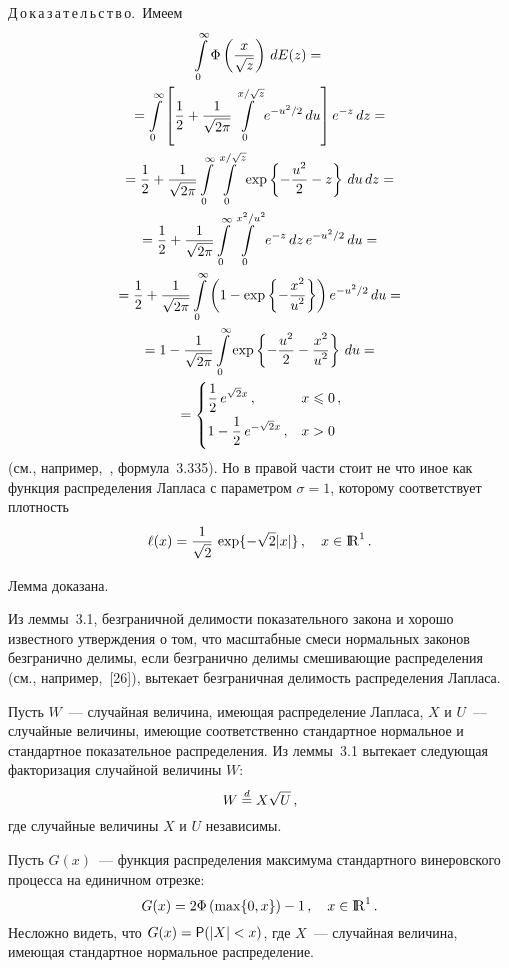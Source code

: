 \begin{multicols}{2}
\noindent
Д\,о\,к\,а\,з\,а\,т\,е\,л\,ь\,с\,т\,в\,о.~Имеем
\begin{multline*}
\int\limits_{0}^{\infty}\Phi\left(\fr{x}{\sqrt{z}}\right)\,dE(z)={}\\
{}=\int\limits_{0}^
{\infty}\left[ \fr{1}{2}+
\fr{1}{\sqrt{2\pi}}\int\limits_{0}^{x/\sqrt{z}}e^{-u^2/2}\,du\right ]
e^{-z}\,dz={}\\
{}=\fr{1}{2}+\fr{1}{\sqrt{2\pi}}\int\limits_{0}^{\infty}
\int\limits_{0}^{x/\sqrt{z}}\exp\left\{
-\fr{u^2}{2}-z\right \}\,du\,dz={}\\
{}=
\fr{1}{2}+\fr{1}{\sqrt{2\pi}}
\int\limits_{0}^{\infty}\int\limits_{0}^{x^2/u^2}e^{-z}\,dz\,
e^{-u^2/2}\,du={}\\
{}
=\fr{1}{2}+\fr{1}{\sqrt{2\pi}}\int\limits_{0}^{\infty}\left(
1-\exp\left \{-\fr{x^2}{u^2}\right \}\right )e^{-u^2/2}\,du={}\\
{}=
1-\fr{1}{\sqrt{2\pi}}\int\limits_{0}^{\infty}
\exp\left\{-\fr{u^2}{2}-\fr{x^2}{u^2}\right \}\,du={}\\
{}=
\begin{cases}
\fr{1}{2}\,e^{\sqrt{2}x}\,,&  x\le 0\,,\\
1-\fr{1}{2}\,e^{-\sqrt{2}x}\,, & x>0
\end{cases}
\end{multline*}
(см., например,~\cite{6be}, формула~3.335). Но в
правой час\-ти стоит не что иное как функция распределения Лапласа с
параметром $\sigma = 1$, которому соответствует плотность
$$
\ell(x)=\fr{1}{\sqrt{2}}\,\exp\{-\sqrt{2}|x|\}\,,\quad x\in{\r}^1\,.
$$

Лемма доказана.

\smallskip

Из леммы~3.1, безграничной делимости показательного закона и хорошо
известного утверж\-дения о том, что масштабные смеси нормальных\linebreak
законов безгранично делимы, если безгранично делимы смешивающие
распределения (см., например,~[26]), вытекает
безграничная делимость распределения Лапласа.

Пусть $W$~--- случайная величина, имеющая распределение Лапласа,
$X$ и $U$~--- случайные величины, имеющие соответственно
стандартное нормальное и стандартное показательное распределения.
Из леммы~3.1 вытекает следующая факторизация случайной величины $W$:
\begin{equation}
W\eqd X \sqrt{U}\,,\label{3.1b}
\end{equation}
где случайные величины $X$ и $U$ независимы.

Пусть $G(x)$~--- функция распределения максимума стандартного
винеровского процесса на единичном отрезке:
$$
G(x)=2\Phi\left (\max\{0,x\}\right )-1\,,\quad x\in{\r}^1\,.
$$ Несложно
видеть, что $G(x)={\sf P}(|X|<x)$, где $X$~--- случайная величина,
имеющая стандартное нормальное распределение.


\end{multicols}
